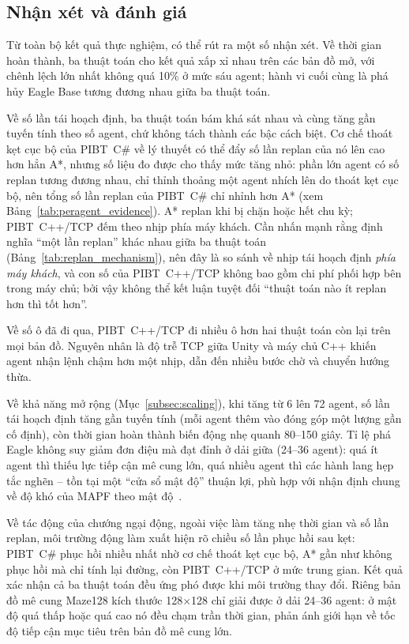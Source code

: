\documentclass[../DoAn.tex]{subfiles}
\begin{document}
\subsection{Nhận xét và đánh giá}

Từ toàn bộ kết quả thực nghiệm, có thể rút ra một số nhận xét. Về thời gian hoàn thành, ba thuật
toán cho kết quả xấp xỉ nhau trên các bản đồ mở, với chênh lệch lớn nhất không quá 10\% ở mức
sáu agent; hành vi cuối cùng là phá hủy Eagle Base tương đương nhau giữa ba thuật toán.

Về số lần tái hoạch định, ba thuật toán bám khá sát nhau và cùng tăng gần tuyến tính theo số agent,
chứ không tách thành các bậc cách biệt. Cơ chế thoát kẹt cục bộ của PIBT~C\# về lý thuyết có thể
đẩy số lần replan của nó lên cao hơn hẳn A*, nhưng số liệu đo được cho thấy mức tăng nhỏ: phần lớn
agent có số replan tương đương nhau, chỉ thỉnh thoảng một agent nhích lên do thoát kẹt cục bộ, nên
tổng số lần replan của PIBT~C\# chỉ nhỉnh hơn A* (xem Bảng~\ref{tab:peragent_evidence}). A* replan khi bị chặn hoặc hết chu kỳ; PIBT~C++/TCP đếm theo nhịp
phía máy khách. Cần nhấn mạnh rằng định nghĩa ``một lần replan'' khác nhau giữa ba thuật toán
(Bảng~\ref{tab:replan_mechanism}), nên đây là so sánh về nhịp tái hoạch định \emph{phía máy khách},
và con số của PIBT~C++/TCP không bao gồm chi phí phối hợp bên trong máy chủ; bởi vậy không thể kết
luận tuyệt đối ``thuật toán nào ít replan hơn thì tốt hơn''.

Về số ô đã đi qua, PIBT~C++/TCP đi nhiều ô hơn hai thuật toán còn lại trên mọi bản đồ. Nguyên
nhân là độ trễ TCP giữa Unity và máy chủ C++ khiến agent nhận lệnh chậm hơn một nhịp, dẫn đến
nhiều bước chờ và chuyển hướng thừa.

Về khả năng mở rộng (Mục~\ref{subsec:scaling}), khi tăng từ 6 lên 72 agent, số lần tái hoạch định
tăng gần tuyến tính (mỗi agent thêm vào đóng góp một lượng gần cố định), còn thời gian hoàn thành
biến động nhẹ quanh 80--150 giây. Tỉ lệ phá Eagle không suy giảm đơn điệu mà đạt đỉnh ở dải giữa
(24--36 agent): quá ít agent thì thiếu lực tiếp cận mê cung lớn, quá nhiều agent thì các hành lang
hẹp tắc nghẽn -- tồn tại một ``cửa sổ mật độ'' thuận lợi, phù hợp với nhận định chung về độ khó của
MAPF theo mật độ~\cite{stern2019mapf,sharon2015cbs}.

Về tác động của chướng ngại động, ngoài việc làm tăng nhẹ thời gian và số lần replan, môi trường
động làm xuất hiện rõ chiều số lần phục hồi sau kẹt: PIBT~C\# phục hồi nhiều nhất nhờ cơ chế thoát
kẹt cục bộ, A* gần như không phục hồi mà chỉ tính lại đường, còn PIBT~C++/TCP ở mức trung gian.
Kết quả xác nhận cả ba thuật toán đều ứng phó được khi môi trường thay đổi. Riêng bản đồ mê cung
Maze128 kích thước 128$\times$128 chỉ giải được ở dải 24--36 agent: ở mật độ quá thấp hoặc quá cao
nó đều chạm trần thời gian, phản ánh giới hạn về tốc độ tiếp cận mục tiêu trên bản đồ mê cung lớn.
\end{document}
